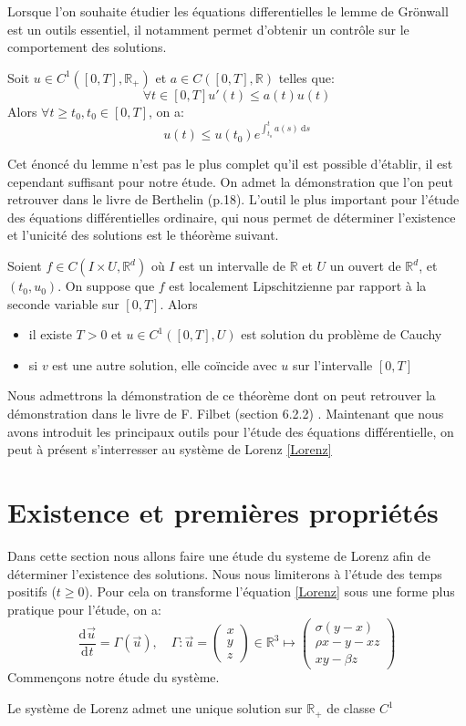\documentclass{article}
\newcommand*\colv[1]{
\left(\begin{array}{c}
    #1
\end{array}\right)
}
\newcommand{\R}{\mathbb{R}}
\newcommand{\deriv}[3][ ]{
    \ensuremath{\frac{\mathrm{d}^{#1}#2}{\mathrm{d}^{#1} #3}}
}
\newtheorem[M , nocut]{prop}{Proposition}[section]
\newtheorem[S , nocut]{definition}{Définition}
\newtheorem[S , nocut]{lemme}{Lemme}
\newtheorem[L , nocut]{thm}{Théoreme}
\newtheorem[L , nocut]{cor}{Corollaire}
\begin{document}
Lorsque l'on souhaite étudier les équations differentielles le lemme de Grönwall est un outils essentiel, il notamment permet d'obtenir un contrôle sur le comportement des solutions.
\begin{lemme}
    \label{lemme:Gronwall}
    Soit $u\in C^1([0,T],\R_+)$ et $a\in C([0,T],\R)$ telles que:
    \[
      \forall t \in [0,T] u'(t)\le a(t)u(t)  
    \]Alors $\forall t \ge t_0, t_0 \in [0,T]$, on a:
    \[
        u(t) \le u(t_0)e^{\int_{t_o}^t a(s)\ \mathrm{d}s}
    \]
\end{lemme}
Cet énoncé du lemme n'est pas le plus complet qu'il est possible d'établir, il est cependant suffisant pour notre étude. On admet la démonstration que l'on peut retrouver dans le livre de Berthelin (p.18). 
L'outil le plus important pour l'étude des équations différentielles ordinaire, qui nous permet de déterminer l'existence et l'unicité des solutions est le théorème suivant.
\begin{thm}
    \label{thm:CL}
    Soient $f\in C(I\times U, \R^d)$ où $I$ est un intervalle de $\R$ et $U$ un ouvert de $\R^d$, et $(t_0,u_0)$. On suppose que $f$ est localement Lipschitzienne par rapport à la seconde variable sur $[0,T]$. Alors 
    \begin{itemize}
        \item il existe $T>0$ et $u\in C^1([0,T],U)$ est solution du problème de Cauchy
        \item si $v$ est une autre solution, elle coïncide avec $u$ sur l'intervalle $[0,T]$
    \end{itemize}
\end{thm}
Nous admettrons la démonstration de ce théorème dont on peut retrouver la démonstration dans le livre de F. Filbet (section 6.2.2) \cite{francis_filbet_analyse_2009}.
Maintenant que nous avons introduit les principaux outils pour l'étude des équations différentielle, on peut à présent s'interresser au système de Lorenz \eqref{Lorenz}

\newpage
\section{Existence et premières propriétés}

Dans cette section nous allons faire une étude du systeme de Lorenz afin de déterminer l'existence des solutions. Nous nous limiterons à l'étude des temps positifs ($t \ge 0$). Pour cela on transforme l'équation \eqref{Lorenz} sous une forme plus pratique pour l'étude, on a:
\begin{equation}
    \label{fLorenz}
    \deriv{\Vec{u}}{t} = \Gamma(\Vec{u}), \quad
    \Gamma : \Vec{u} = \colv{x\\y\\z} \in \R^3 \mapsto \colv{\sigma(y-x) \\ \rho x-y-xz \\ xy-\beta z}
    \end{equation}
Commençons notre étude du système.
\begin{prop}
    Le système de Lorenz admet une unique solution sur $\R_+$ de classe $C^1$
\end{prop}
\end{document}
